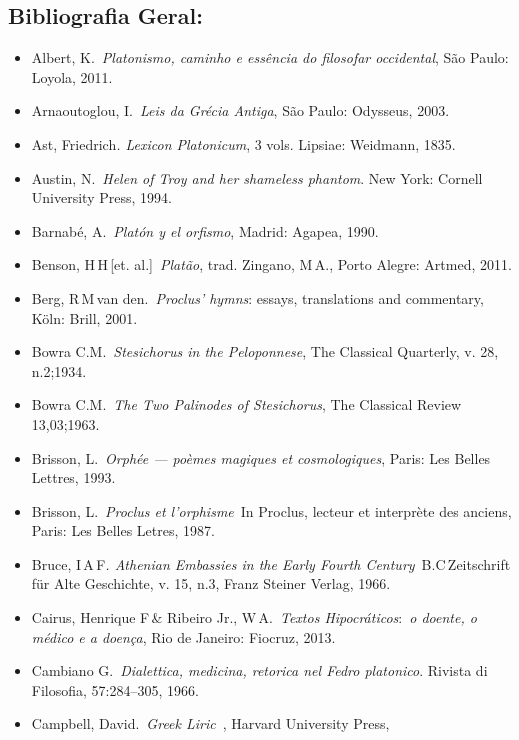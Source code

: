 { 

 

\subsection{Bibliografia Geral:}

 

\begin{itemize}
\itemsep1pt\parskip0pt
\item
  Albert, K.~\emph{Platonismo, caminho e essência do filosofar
  occidental}, São Paulo: Loyola, 2011.
\item
  Arnaoutoglou, I.~\emph{Leis da Grécia Antiga}, São Paulo: Odysseus,
  2003.
\item
  Ast, Friedrich\emph{. Lexicon Platonicum}, 3 vols. Lipsiae: Weidmann,
  1835.
\item
  Austin, N.~\emph{Helen of Troy and her shameless phantom}. New York:
  Cornell University Press, 1994.
\item
  Barnabé, A.~\emph{Platón y el orfismo}, Madrid: Agapea, 1990.
\item
  Benson, H\,H\,[et. al.]~\emph{Platão}, trad. Zingano, M\,A., Porto
  Alegre: Artmed, 2011.
\item
  Berg, R\,M\,van den.~\emph{Proclus' hymns}: essays, translations and
  commentary, Köln: Brill, 2001.
\item
  Bowra C.M.~\emph{Stesichorus in the Peloponnese}, The Classical
  Quarterly, v. 28, n.2;1934.
\item
  Bowra C.M.~\emph{The Two Palinodes of Stesichorus}, The Classical
  Review 13,03;1963.
\item
  Brisson, L.~\emph{Orphée --- poèmes magiques et cosmologiques}, Paris:
  Les Belles Lettres, 1993.
\item
  Brisson, L.~\emph{Proclus et l'orphisme}~In Proclus, lecteur et
  interprète des anciens, Paris: Les Belles Letres, 1987.
\item
  Bruce, I\,A\,F\emph{. Athenian Embassies in the Early Fourth
  Century}~B.C\,Zeitschrift für Alte Geschichte, v. 15, n.3, Franz
  Steiner Verlag, 1966.
\item
  Cairus, Henrique F\,\& Ribeiro Jr., W\,A.~\emph{Textos
  Hipocráticos}:~\emph{o doente, o médico e a doença}, Rio de Janeiro:
  Fiocruz, 2013.
\item
  Cambiano G.~\emph{Dialettica, medicina, retorica nel Fedro platonico}.
  Rivista di Filosofia, 57:284--305, 1966.
\item
  Campbell, David.~\emph{Greek Liric}~, Harvard University Press,

\end{itemize}}
